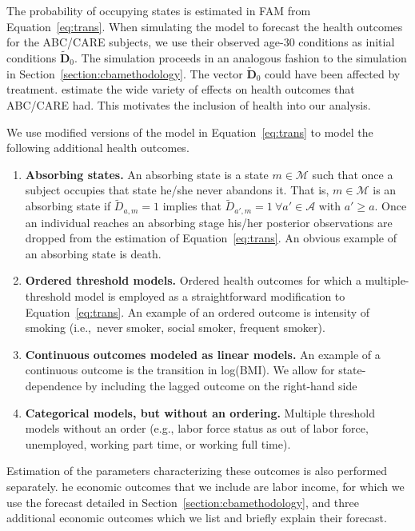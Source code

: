 The probability of occupying states is estimated in FAM from Equation~\eqref{eq:trans}. When simulating the model to forecast the health outcomes for the ABC/CARE subjects, we use their observed age-30 conditions as initial conditions  $\tilde{\bm{D}}_0$. The simulation proceeds in an analogous fashion to the simulation in Section~\ref{section:cbamethodology}. The vector $\tilde{\bm{D}}_0$ could have been affected by treatment. \citet{Campbell_Conti_etal_2014_EarlyChildhoodInvestments} estimate the wide variety of effects on health outcomes that ABC/CARE had. This motivates the inclusion of health into our analysis.

We use modified versions of the model in Equation~\eqref{eq:trans} to model the following additional health outcomes.

\begin{enumerate}
\item \textbf{Absorbing states.} An absorbing state is a state $m \in \mathcal{M}$ such that once a subject occupies that state he/she never abandons it. That is, $m \in \mathcal{M}$ is an absorbing state if $\tilde{D}_{a,m} = 1$ implies that $\tilde{D}_{a',m} = 1 \ \forall a' \in \mathcal{A}$ with $a' \geq a.$ Once an individual reaches an absorbing stage his/her posterior observations are dropped from the estimation of Equation~\eqref{eq:trans}. An obvious example of an absorbing state is death.
\item \textbf{Ordered threshold models.} Ordered health outcomes for which a multiple-threshold model is employed as a straightforward modification to Equation~\eqref{eq:trans}. An example of an ordered outcome is intensity of smoking (i.e.,\ never smoker, social smoker, frequent smoker).
\item \textbf{Continuous outcomes modeled as linear models.} An example of a continuous outcome is the
transition in log(BMI). We allow for state-dependence by including the lagged outcome on the right-hand side
\item \textbf{Categorical models, but without an ordering.} Multiple threshold models without an order (e.g., labor force status as out of labor force, unemployed, working part time, or working full time).
\end{enumerate}

Estimation of the parameters characterizing these outcomes is also performed separately. he economic outcomes that we include are labor income, for which we use the forecast detailed in Section~\ref{section:cbamethodology}, and three additional economic outcomes which we list and briefly explain their forecast. 

